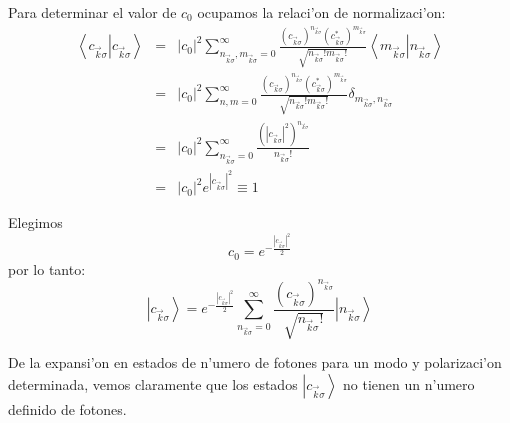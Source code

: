 Para determinar el valor de $c_{0}$ ocupamos la relaci'on de
normalizaci'on:%
\begin{eqnarray}
\left\langle c_{\vec{k}\sigma}\right| \left. c_{\vec{k}\sigma
}\right> & = &\left| c_{0}\right| ^{2}\sum_{n_{\vec{k}\sigma
},m_{\vec{k}\sigma}=0}^{\infty}\frac{\left( c_{\vec{k}\sigma}\right)
^{n_{\vec{k}\sigma}}\left( c_{\vec{k}\sigma}^{\ast}\right) ^{m_{\vec
{k}\sigma}}}{\sqrt{n_{\vec{k}\sigma}!m_{\vec{k}\sigma}!}}\left\langle
m_{\vec{k}\sigma}\right| \left. n_{\vec{k}\sigma}\right> \\
& = &\left| c_{0}\right| ^{2}\sum_{n,m=0}^{\infty}\frac{\left(
c_{\vec{k}\sigma}\right) ^{n_{\vec{k}\sigma}}\left( c_{\vec{k}\sigma}^{\ast
}\right) ^{m_{\vec{k}\sigma}}}{\sqrt{n_{\vec{k}\sigma}!m_{\vec{k}\sigma}!}%
}\delta_{m_{\vec{k}\sigma},n_{\vec{k}\sigma}}\\
& = &\left| c_{0}\right| ^{2}\sum_{n_{\vec{k}\sigma}=0}^{\infty}%
\frac{\left( \left| c_{\vec{k}\sigma}\right| ^{2}\right)
^{n_{\vec{k}\sigma}}}{n_{\vec{k}\sigma}!}\\
& = &\left| c_{0}\right| ^{2}e^{\left| c_{\vec{k}\sigma}\right|^{2}}\equiv 1
\end{eqnarray}


Elegimos%
\begin{equation}
c_{0}=e^{-\frac{\left| c_{\vec{k}\sigma}\right| ^{2}}{2}}%
\end{equation}
por lo tanto:%
\begin{equation}
\left| c_{\vec{k}\sigma}\right> =e^{-\frac{\left| c_{\vec
{k}\sigma}\right| ^{2}}{2}}\sum_{n_{\vec{k}\sigma}=0}^{\infty}%
\frac{\left( c_{\vec{k}\sigma}\right) ^{n_{\vec{k}\sigma}}}{\sqrt{n_{\vec
{k}\sigma}!}}\left| n_{\vec{k}\sigma}\right>
\label{Estado de Glauber}%
\end{equation}


De la expansi'on en estados de n'umero de fotones para un modo y
polarizaci'on determinada, vemos claramente que los estados $\left|
c_{\vec{k}\sigma}\right> $ no tienen un n'umero definido de fotones.

